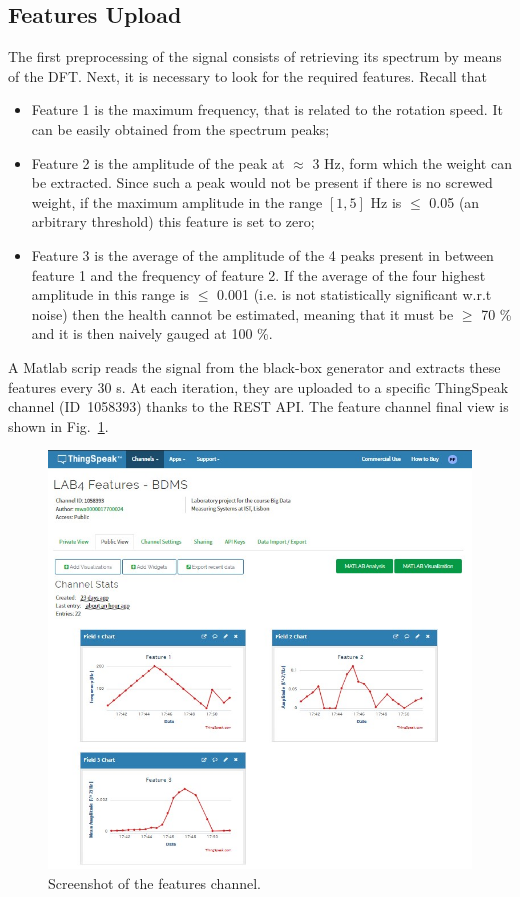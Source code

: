 \documentclass[12pt]{article}
\begin{document}
\subsection{Features Upload}
The first preprocessing of the signal consists of retrieving its spectrum by means of the DFT. Next, it is necessary to look for the required features. Recall that
\begin{itemize}
	\item Feature 1 is the maximum frequency, that is related to the rotation speed. It can be easily obtained from the spectrum peaks;
	\item Feature 2 is the amplitude of the peak at $\approx$ 3 Hz, form which the weight can be extracted. Since such a peak would not be present if there is no screwed weight, if the maximum amplitude in the range $[1,5]$ Hz is $\leq$ 0.05 (an arbitrary threshold) this feature is set to zero;
	\item Feature 3 is the average of the amplitude of the 4 peaks present in between feature 1 and the frequency of feature 2. If the average of the four highest amplitude in this range is $\leq$ 0.001 (i.e. is not statistically significant w.r.t noise) then the health cannot be estimated, meaning that it must be $\geq$ 70 \% and it is then naively gauged at 100 \%.
\end{itemize} 	
A Matlab scrip reads the signal from the black-box generator and extracts these features every 30 s. At each iteration, they are uploaded to a specific ThingSpeak channel (ID~1058393) thanks to the REST API. The feature channel final view is shown in Fig.~\ref{fig:TSFeatures}.
\begin{figure}[h!]
	\centering
	\includegraphics[width=0.9\linewidth]{Figures/TSFeatures}
	\caption{Screenshot of the features channel.}
	\label{fig:TSFeatures}
\end{figure}
\end{document}
